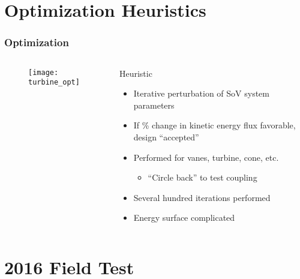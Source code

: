 \documentclass[mathserif]{beamer}
\begin{document}
\section{Optimization Heuristics}
%
%
\begin{frame}
 \frametitle{Optimization}

 \begin{columns}[]
  \begin{column}{0.5\linewidth}

    \begin{figure}[htb]
     \centering
     \texttt{[image: turbine\_opt]}
    \end{figure}

  \end{column}
  \begin{column}{0.5\linewidth}

    \begin{block}{Heuristic}
      \begin{itemize}
        \item Iterative perturbation of SoV system parameters
        \item If \% change in kinetic energy flux favorable, design ``accepted''
	\item Performed for vanes, turbine, cone, etc. 
          \begin{itemize}	
            \item ``Circle back'' to test coupling
          \end{itemize}
	\item Several hundred iterations performed
	\item Energy surface complicated
      \end{itemize}
    \end{block}

  \end{column}
  \end{columns}
 
\end{frame}



\section{2016 Field Test}
%
%

\end{document}
